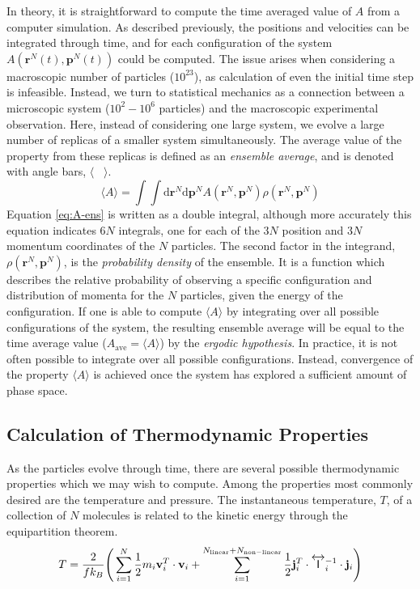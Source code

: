 In theory, it is straightforward to compute the time averaged value of
$A$ from a computer simulation. As described previously, the positions
and velocities can be integrated through time, and for each
configuration of the system $A(\mathbf{r}^N(t),\mathbf{p}^N(t))$ could
be computed. The issue arises when considering a macroscopic number of
particles ($10^{23}$), as calculation of even the initial time step is
infeasible. Instead, we turn to statistical mechanics as a connection
between a microscopic system ($10^2 - 10^6$ particles) and the
macroscopic experimental observation. Here, instead of considering one
large system, we evolve a large number of replicas of a smaller
system simultaneously. The average value of the property from these
replicas is defined as an \textit{ensemble average}, and is denoted
with angle bars, $\langle$~ $\rangle$.
\begin{equation}\label{eq:A-ens}
\langle A \rangle = \int \int \mathrm{d}\mathbf{r}^N \mathrm{d}\mathbf{p}^N
A(\mathbf{r}^N,\mathbf{p}^N) \rho
(\mathbf{r}^N,\mathbf{p}^N)
\end{equation}
Equation \eqref{eq:A-ens} is written as a double integral, although
more accurately this equation indicates $6N$ integrals, one for each
of the $3N$ position and $3N$ momentum coordinates of the $N$
particles. The second factor in the integrand,
$ \rho(\mathbf{r}^N,\mathbf{p}^N)$, is the \textit{probability
  density} of the ensemble. It is a function which describes the
relative probability of observing a specific configuration and
distribution of momenta for the $N$ particles, given the energy of the
configuration. If one is able to compute $\langle A \rangle$ by
integrating over all possible configurations of the system, the
resulting ensemble average will be equal to the time average value
($A_{\mathrm{ave}} = \langle A \rangle$) by the \textit{ergodic
  hypothesis}. In practice, it is not often possible to integrate over
all possible configurations. Instead, convergence of the property
$\langle A \rangle$ is achieved once the system has explored a
sufficient amount of phase space.

\subsection{Calculation of Thermodynamic Properties}
As the particles evolve through time, there are several possible
thermodynamic properties which we may wish to compute. Among the
properties most commonly desired are the temperature and pressure.
The instantaneous temperature, $T$, of a collection of $N$ molecules
is related to the kinetic energy through the equipartition
theorem.
\begin{equation}\label{Temperature}
T = \frac{2}{fk_B}\Bigg( \sum_{i=1}^{N} \frac{1}{2} m_i {\bf v}_i^T \cdot {\bf v}_i +
\sum_{i=1}^{N_{\mathrm{linear}}+N_{\mathrm{non-linear}}}  \frac{1}{2} {\bf j}_i^T \cdot
\overleftrightarrow{\mathsf{I}}_i^{-1} \cdot {\bf j}_i  \Bigg)
\end{equation}

